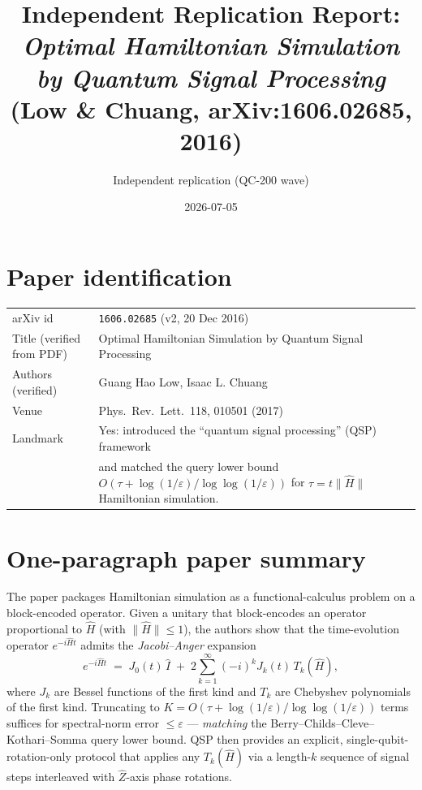 \documentclass[11pt]{article}
\title{Independent Replication Report:\\
       \emph{Optimal Hamiltonian Simulation by Quantum Signal Processing}\\
       {\normalsize (Low \& Chuang, arXiv:1606.02685, 2016)}}
\author{Independent replication (QC-200 wave)}
\date{2026-07-05}
\begin{document}
\maketitle

\section{Paper identification}
\begin{tabular}{ll}
\toprule
arXiv id & \texttt{1606.02685} (v2, 20 Dec 2016) \\
Title (verified from PDF) & Optimal Hamiltonian Simulation by Quantum Signal Processing \\
Authors (verified) & Guang Hao Low, Isaac L. Chuang \\
Venue & Phys.\ Rev.\ Lett.\ 118, 010501 (2017) \\
Landmark & Yes: introduced the ``quantum signal processing'' (QSP) framework\\
         & and matched the query lower bound
           $O(\tau + \log(1/\varepsilon)/\log\log(1/\varepsilon))$ for
           $\tau = t\|\hat H\|$ Hamiltonian simulation. \\
\bottomrule
\end{tabular}

\section{One-paragraph paper summary}
The paper packages Hamiltonian simulation as a functional-calculus problem
on a block-encoded operator. Given a unitary that block-encodes an operator
proportional to $\hat H$ (with $\|\hat H\|\le 1$), the authors show that the
time-evolution operator $e^{-i\hat H t}$ admits the \emph{Jacobi--Anger}
expansion
\[
  e^{-i\hat H t} \;=\; J_0(t)\,\hat I \;+\; 2\sum_{k=1}^{\infty} (-i)^k J_k(t)\, T_k(\hat H),
\]
where $J_k$ are Bessel functions of the first kind and $T_k$ are Chebyshev
polynomials of the first kind. Truncating to $K = O\!\left(\tau + \log(1/\varepsilon)/\log\log(1/\varepsilon)\right)$ terms suffices for spectral-norm error $\le \varepsilon$
--- \emph{matching} the Berry--Childs--Cleve--Kothari--Somma query
lower bound. QSP then provides an explicit, single-qubit-rotation-only
protocol that applies any $T_k(\hat H)$ via a length-$k$ sequence of
signal steps interleaved with $\hat Z$-axis phase rotations.
\end{document}
